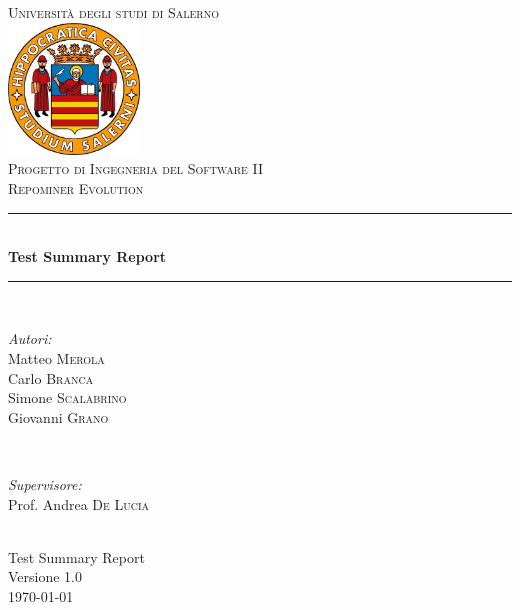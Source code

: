 \documentclass[a4paper, 12pt, italian]{report}
\begin{document}
\begin{titlepage}
\newcommand{\HRule}{\rule{\linewidth}{0.5mm}} 
\center 
\textsc{\LARGE Università degli studi di Salerno}\\[1cm] 
\includegraphics[width=3.5cm]{img/logo.jpg} \\[1cm]
\textsc{\large Progetto di Ingegneria del Software II}\\[0.5cm]
\textsc{\Large Repominer Evolution}\\[0.5cm] 
 \HRule \\[0.4cm]
{ \large \bfseries Test Summary Report}\\[0.4cm] 
\HRule \\[1.5cm]

\begin{minipage}{0.4\textwidth}
\begin{flushleft} \large
\emph{Autori:}\\
Matteo \textsc{Merola}\\
Carlo \textsc{Branca}\\
Simone \textsc{Scalabrino}\\
Giovanni \textsc{Grano}\\
\end{flushleft}
\end{minipage}
~
\begin{minipage}{0.4\textwidth}
\begin{flushright} \large
\emph{Supervisore:} \\
Prof. Andrea \textsc{De Lucia}
\end{flushright}
\end{minipage}\\[2.5cm]

{\Large Test Summary Report}\\
Versione 1.0\\[1cm]

{\large \today} %

\vfill

\end{titlepage}		
	
\end{document}
